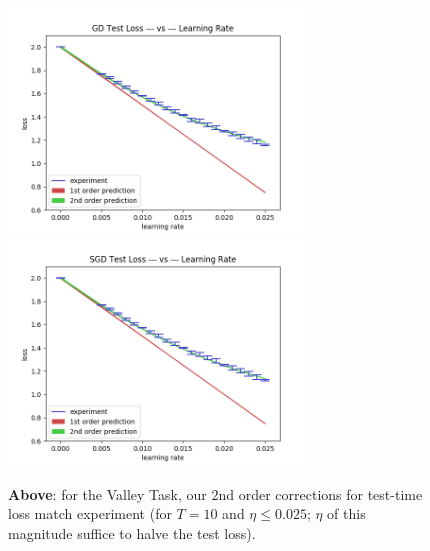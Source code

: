 \documentclass[12pt]{article}
\begin{document}
            \begin{figure}[h]
                \includegraphics[width=8cm]{imgs/gauss.10/out-gd}
                \includegraphics[width=8cm]{imgs/gauss.10/out-sgd}
                \caption*{
                    {\bf Above}: for the Valley Task, our $2$nd order corrections for test-time loss match experiment
                    (for $T=10$ and $\eta \leq 0.025$; $\eta$ of this magnitude suffice to halve the test loss).
                }
            \end{figure}
\end{document}
